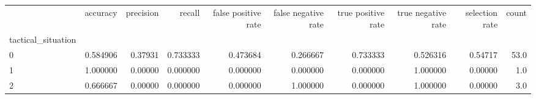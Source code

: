 \begin{tabular}{lrrrrrrrrr}
\toprule
{} &  accuracy &  precision &    recall &  false positive rate &  false negative rate &  true positive rate &  true negative rate &  selection rate &  count \\
tactical\_situation &           &            &           &                      &                      &                     &                     &                 &        \\
\midrule
0                  &  0.584906 &    0.37931 &  0.733333 &             0.473684 &             0.266667 &            0.733333 &            0.526316 &         0.54717 &   53.0 \\
1                  &  1.000000 &    0.00000 &  0.000000 &             0.000000 &             0.000000 &            0.000000 &            1.000000 &         0.00000 &    1.0 \\
2                  &  0.666667 &    0.00000 &  0.000000 &             0.000000 &             1.000000 &            0.000000 &            1.000000 &         0.00000 &    3.0 \\
\bottomrule
\end{tabular}
